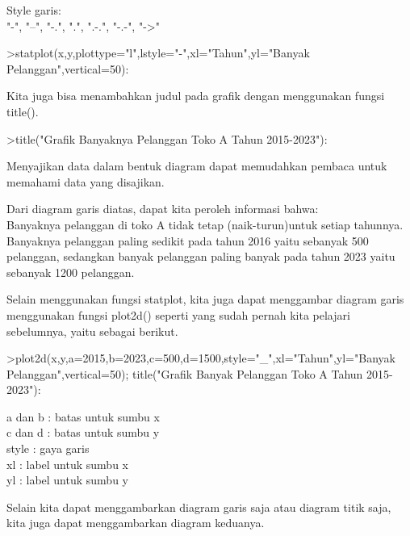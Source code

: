 \documentclass{article}
\begin{document}
\begin{eulernotebook}
\begin{eulercomment}
\begin{eulercomment}
\begin{eulercomment}
Style garis:\\
"-", "--", "-.", ".", ".-.", "-.-", "-\textgreater{}"
\end{eulercomment}
\begin{eulerprompt}
>statplot(x,y,plottype="l",lstyle="-",xl="Tahun",yl="Banyak Pelanggan",vertical=50):
\end{eulerprompt}
\begin{eulercomment}
Kita juga bisa menambahkan judul pada grafik dengan menggunakan fungsi
title().
\end{eulercomment}
\begin{eulerprompt}
>title("Grafik Banyaknya Pelanggan Toko A Tahun 2015-2023"):
\end{eulerprompt}
\begin{eulercomment}
Menyajikan data dalam bentuk diagram dapat memudahkan pembaca untuk
memahami data yang disajikan.

Dari diagram garis diatas, dapat kita peroleh informasi bahwa:\\
Banyaknya pelanggan di toko A tidak tetap (naik-turun)untuk setiap
tahunnya.\\
Banyaknya pelanggan paling sedikit pada tahun 2016 yaitu sebanyak 500
pelanggan, sedangkan banyak pelanggan paling banyak pada tahun 2023
yaitu sebanyak 1200 pelanggan.

Selain menggunakan fungsi statplot, kita juga dapat menggambar diagram
garis menggunakan fungsi plot2d() seperti yang sudah pernah kita
pelajari sebelumnya, yaitu sebagai berikut.
\end{eulercomment}
\begin{eulerprompt}
>plot2d(x,y,a=2015,b=2023,c=500,d=1500,style="_",xl="Tahun",yl="Banyak Pelanggan",vertical=50); title("Grafik Banyak Pelanggan Toko A Tahun 2015-2023"):
\end{eulerprompt}
\begin{eulercomment}
a dan b : batas untuk sumbu x\\
c dan d : batas untuk sumbu y\\
style : gaya garis\\
xl : label untuk sumbu x\\
yl : label untuk sumbu y
\end{eulercomment}
\begin{eulercomment}
Selain kita dapat menggambarkan diagram garis saja atau diagram titik
saja, kita juga dapat menggambarkan diagram keduanya.


\end{eulercomment}
\end{eulercomment}
\end{eulercomment}
\end{eulernotebook}
\end{document}
